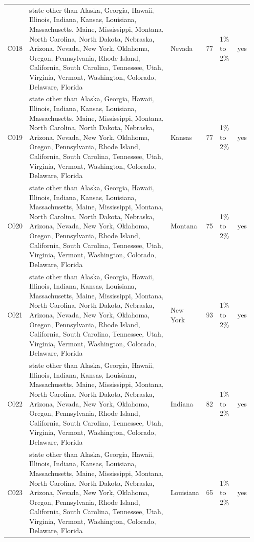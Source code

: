 \documentclass[a4paper,10pt]{article}
\newif\ifreviewmarks
\newcommand{\reviewrule}{\noindent{\color{BrickRed}\rule{\linewidth}{0.8pt}}}
\newenvironment{drafted}[1][]{%
  \ifreviewmarks\par\addvspace{\medskipamount}\reviewrule\par\nopagebreak
  \noindent{\color{BrickRed}\sffamily\footnotesize\textbf{Thesis Draft}\quad #1\hfill review}\par\nopagebreak\smallskip\fi}{%
  \ifreviewmarks\par\smallskip\noindent{\color{BrickRed}\sffamily\footnotesize end of thesis draft}\par\nopagebreak\reviewrule\par\medskip\fi}
\begin{document}
\begin{drafted}[plain-language layer: churn100-s4-c3]
{\begin{longtable}{@{}lllrlc@{}}
C018 & state other than Alaska, Georgia, Hawaii, Illinois, Indiana, Kansas, Louisiana, Massachusetts, Maine, Mississippi, Montana, North Carolina, North Dakota, Nebraska, Arizona, Nevada, New York, Oklahoma, Oregon, Pennsylvania, Rhode Island, California, South Carolina, Tennessee, Utah, Virginia, Vermont, Washington, Colorado, Delaware, Florida & Nevada & 77 & 1\% to 2\% & \textcolor{OliveGreen}{yes} \\
C019 & state other than Alaska, Georgia, Hawaii, Illinois, Indiana, Kansas, Louisiana, Massachusetts, Maine, Mississippi, Montana, North Carolina, North Dakota, Nebraska, Arizona, Nevada, New York, Oklahoma, Oregon, Pennsylvania, Rhode Island, California, South Carolina, Tennessee, Utah, Virginia, Vermont, Washington, Colorado, Delaware, Florida & Kansas & 77 & 1\% to 2\% & \textcolor{OliveGreen}{yes} \\
C020 & state other than Alaska, Georgia, Hawaii, Illinois, Indiana, Kansas, Louisiana, Massachusetts, Maine, Mississippi, Montana, North Carolina, North Dakota, Nebraska, Arizona, Nevada, New York, Oklahoma, Oregon, Pennsylvania, Rhode Island, California, South Carolina, Tennessee, Utah, Virginia, Vermont, Washington, Colorado, Delaware, Florida & Montana & 75 & 1\% to 2\% & \textcolor{OliveGreen}{yes} \\
C021 & state other than Alaska, Georgia, Hawaii, Illinois, Indiana, Kansas, Louisiana, Massachusetts, Maine, Mississippi, Montana, North Carolina, North Dakota, Nebraska, Arizona, Nevada, New York, Oklahoma, Oregon, Pennsylvania, Rhode Island, California, South Carolina, Tennessee, Utah, Virginia, Vermont, Washington, Colorado, Delaware, Florida & New York & 93 & 1\% to 2\% & \textcolor{OliveGreen}{yes} \\
C022 & state other than Alaska, Georgia, Hawaii, Illinois, Indiana, Kansas, Louisiana, Massachusetts, Maine, Mississippi, Montana, North Carolina, North Dakota, Nebraska, Arizona, Nevada, New York, Oklahoma, Oregon, Pennsylvania, Rhode Island, California, South Carolina, Tennessee, Utah, Virginia, Vermont, Washington, Colorado, Delaware, Florida & Indiana & 82 & 1\% to 2\% & \textcolor{OliveGreen}{yes} \\
C023 & state other than Alaska, Georgia, Hawaii, Illinois, Indiana, Kansas, Louisiana, Massachusetts, Maine, Mississippi, Montana, North Carolina, North Dakota, Nebraska, Arizona, Nevada, New York, Oklahoma, Oregon, Pennsylvania, Rhode Island, California, South Carolina, Tennessee, Utah, Virginia, Vermont, Washington, Colorado, Delaware, Florida & Louisiana & 65 & 1\% to 2\% & \textcolor{OliveGreen}{yes} \\

\end{longtable}}
\end{drafted}
\end{document}
